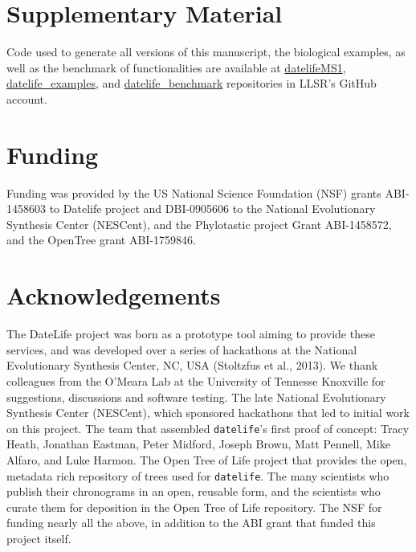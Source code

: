 \documentclass[
  english,
  man]{apa6}
\begin{document}
\hypertarget{supplementary-material}{%
\section{Supplementary Material}\label{supplementary-material}}

Code used to generate all versions of this manuscript, the biological examples, as well as the benchmark of functionalities are available at \href{https://github.com/LunaSare/datelifeMS1}{datelifeMS1}, \href{https://github.com/LunaSare/datelife_examples}{datelife\_examples}, and \href{https://github.com/LunaSare/datelife_benchmark}{datelife\_benchmark} repositories in LLSR's GitHub account.

\hypertarget{funding}{%
\section{Funding}\label{funding}}

Funding was provided by the US National Science Foundation (NSF) grants ABI-1458603 to Datelife project and DBI-0905606 to the National Evolutionary Synthesis Center (NESCent), and the Phylotastic project Grant ABI-1458572, and the OpenTree grant ABI-1759846.

\hypertarget{acknowledgements}{%
\section{Acknowledgements}\label{acknowledgements}}

The DateLife project was born as a prototype tool aiming to provide these services, and was developed over a series of hackathons at the National Evolutionary Synthesis Center, NC, USA (Stoltzfus et al., 2013).
We thank colleagues from the O'Meara Lab at the University
of Tennesse Knoxville for suggestions, discussions and software testing.
The late National Evolutionary Synthesis Center (NESCent), which sponsored hackathons
that led to initial work on this project. The team that assembled \texttt{datelife}'s first proof of concept: Tracy Heath, Jonathan Eastman, Peter Midford, Joseph Brown, Matt Pennell, Mike Alfaro, and Luke Harmon.
The Open Tree of Life project that provides the open, metadata rich repository of
trees used for \texttt{datelife}.
The many scientists who publish their chronograms in an open, reusable form, and
the scientists who curate them for deposition in the Open Tree of Life repository.
The NSF for funding nearly all the above, in addition to the ABI grant that funded this project itself.
\end{document}
